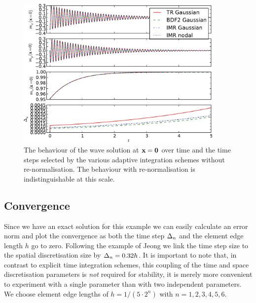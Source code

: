 \begin{figure}
  \centering
  \includegraphics[width=0.9\textwidth]{plots/2d_wave_solution_time_trace/get2oftracevaluesvs-get3oftracevaluesvs-get4oftracevaluesvs-dtsvstimes.pdf}
  \caption{The behaviour of the wave solution at $\boldsymbol{\mathrm{x}} = \mathbf{0}$ over time and the time steps selected by the various adaptive integration schemes without re-normalisation.
The behaviour with re-normalisation is indistinguishable at this scale.}
  \label{fig:2d-wave-time-trace}
\end{figure}


\subsection{Convergence}

Since we have an exact solution for this example we can easily calculate an error norm and plot the convergence as both the time step $\Delta_{n}$ and the element edge length $h$ go to zero.
Following the example of Jeong \etal \cite{Jeong2014} we link the time step size to the spatial discretisation size by $\Delta_{n} = 0.32h$.
It is important to note that, in contrast to explicit time integration schemes, this coupling of the time and space discretisation parameters is \emph{not} required for stability, it is merely more convenient to experiment with a single parameter than with two independent parameters.
We choose element edge lengths of $h = 1/(5 \cdot 2^n)$ with $n=1,2,3,4,5,6$.

